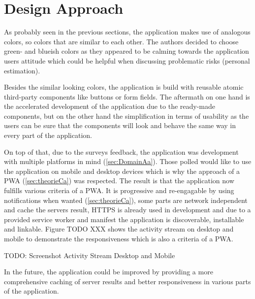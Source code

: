 
\section{Design Approach}
\label{sec:implementationDesign}

As probably seen in the previous sections, the application makes use of analogous colors, so colors that are similar to each other. The authors decided to choose green- and blueish colors as they appeared to be calming towards the application users attitude which could be helpful when discussing problematic risks (personal estimation).

Besides the similar looking colors, the application is build with reusable atomic third-party components like buttons or form fields. The aftermath on one hand is the accelerated development of the application due to the ready-made components, but on the other hand the simplification in terms of usability as the users can be sure that the components will look and behave the same way in every part of the application.

On top of that, due to the surveys feedback, the application was development with multiple platforms in mind (\ref{sec:DomainAa}). Those polled would like to use the application on mobile and desktop devices which is why the approach of a  \acs{PWA} (\ref{sec:theorieCa}) was respected. The result is that the application now fulfills various criteria of a PWA. It is progressive and re-engagable by using notifications when wanted (\ref{sec:theorieCa}), some parts are network independent and cache the servers result, HTTPS is already used in development and due to a provided service worker and manifest the application is discoverable, installable and linkable. Figure TODO XXX shows the activity stream on desktop and mobile to demonstrate the responsiveness which is also a criteria of a  \acs{PWA}.

TODO: Screenshot Activity Stream Desktop and Mobile

In the future, the application could be improved by providing a more comprehensive caching of server results and better responsiveness in various parts of the application.
